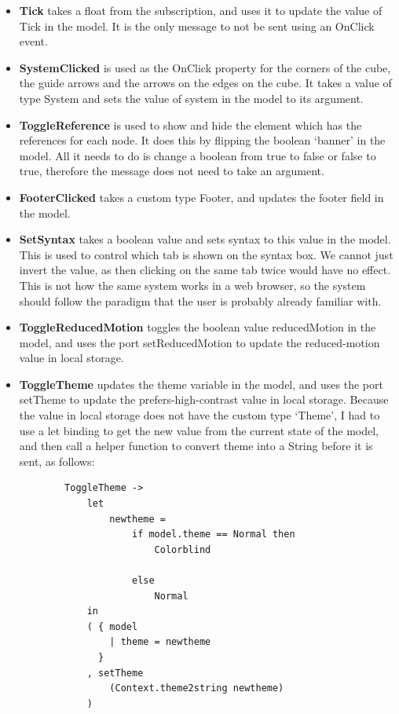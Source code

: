 \documentclass{l4proj}
\begin{document}
\begin{itemize}
    \item \textbf{Tick} takes a float from the subscription, and uses it to update the value of Tick in the model.  It is the only message to not be sent using an OnClick event.

    \item \textbf{SystemClicked} is used as the OnClick property for the corners of the cube, the guide arrows and the arrows on the edges on the cube.  It takes a value of type System and sets the value of system in the model to its argument.

    \item \textbf{ToggleReference} is used to show and hide the element which has the references for each node.  It does this by flipping the boolean `banner' in the model.  All it needs to do is change a boolean from true to false or false to true, therefore the message does not need to take an argument.

    \item \textbf{FooterClicked} takes a custom type Footer, and updates the footer field in the model.

    \item \textbf{SetSyntax} takes a boolean value and sets syntax to this value in the model.  This is used to control which tab is shown on the syntax box.  We cannot just invert the value, as then clicking on the same tab twice would have no effect.  This is not how the same system works in a web browser, so the system should follow the paradigm that the user is probably already familiar with.

    \item \textbf{ToggleReducedMotion} toggles the boolean value reducedMotion in the model, and uses the port setReducedMotion to update the reduced-motion value in local storage.

    \item \textbf{ToggleTheme} updates the theme variable in the model, and uses the port setTheme to update the prefers-high-contrast value in local storage.  Because the value in local storage does not have the custom type `Theme', I had to use a let binding to get the new value from the current state of the model, and then call a helper function to convert theme into a String before it is sent, as follows:

    \begin{lstlisting}
        ToggleTheme ->
            let
                newtheme =
                    if model.theme == Normal then
                        Colorblind

                    else
                        Normal
            in
            ( { model
                | theme = newtheme
              }
            , setTheme
                (Context.theme2string newtheme)
            )
    \end{lstlisting}
\end{itemize}
\end{document}
